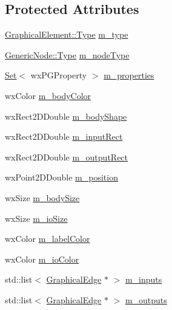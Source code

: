 \subsection*{Protected Attributes}
\begin{DoxyCompactItemize}
\item 
\hyperlink{class_graphical_element_aa485be48b901d85de97b3bd86f381d9e}{Graphical\+Element\+::\+Type} \hyperlink{class_graphical_node_a1e660124c138a5394dc347cb3b523f9f}{m\+\_\+type}
\item 
\hyperlink{class_generic_node_a9e7985ab9bbfa1c85091adc0ab71a6b6}{Generic\+Node\+::\+Type} \hyperlink{class_graphical_node_a8d2546ba2e20ff4eb546de82109e2ac8}{m\+\_\+node\+Type}
\item 
\hyperlink{class_set}{Set}$<$ wx\+P\+G\+Property $>$ \hyperlink{class_graphical_node_a7f45ea17bdca2d822ef4d604effcca0e}{m\+\_\+properties}
\item 
wx\+Color \hyperlink{class_graphical_node_a2bcf3e642619e571bd8b5eca3e7bdbb6}{m\+\_\+body\+Color}
\item 
wx\+Rect2\+D\+Double \hyperlink{class_graphical_node_a9a246386a855e540a97d7f905ad53ba0}{m\+\_\+body\+Shape}
\item 
wx\+Rect2\+D\+Double \hyperlink{class_graphical_node_a83044c99e5ec1898790372dbd47eb612}{m\+\_\+input\+Rect}
\item 
wx\+Rect2\+D\+Double \hyperlink{class_graphical_node_a32936705d981530b574fc66d5553ab9a}{m\+\_\+output\+Rect}
\item 
wx\+Point2\+D\+Double \hyperlink{class_graphical_node_aa93feffd6ce9c9ea4b5063599927fbdc}{m\+\_\+position}
\item 
wx\+Size \hyperlink{class_graphical_node_ab91a1047e6b852fda6828e44d4af1929}{m\+\_\+body\+Size}
\item 
wx\+Size \hyperlink{class_graphical_node_a203b844a6782291e934550ebf9640223}{m\+\_\+io\+Size}
\item 
wx\+Color \hyperlink{class_graphical_node_a11311bff2e360a7441382b1b74db85a8}{m\+\_\+label\+Color}
\item 
wx\+Color \hyperlink{class_graphical_node_a2acac8a373e328b7fd9b627838e04315}{m\+\_\+io\+Color}
\item 
std\+::list$<$ \hyperlink{class_graphical_edge}{Graphical\+Edge} $\ast$ $>$ \hyperlink{class_graphical_node_a82784344a0531de4c11212a13dca28fe}{m\+\_\+inputs}
\item 
std\+::list$<$ \hyperlink{class_graphical_edge}{Graphical\+Edge} $\ast$ $>$ \hyperlink{class_graphical_node_a4c1b0f83285d9425c4b5d8a1b0dc4649}{m\+\_\+outputs}
\end{DoxyCompactItemize}
